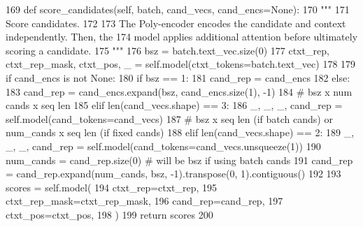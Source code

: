 \begin{DoxyCode}
169     \textcolor{keyword}{def }score\_candidates(self, batch, cand\_vecs, cand\_encs=None):
170         \textcolor{stringliteral}{"""}
171 \textcolor{stringliteral}{        Score candidates.}
172 \textcolor{stringliteral}{}
173 \textcolor{stringliteral}{        The Poly-encoder encodes the candidate and context independently. Then, the}
174 \textcolor{stringliteral}{        model applies additional attention before ultimately scoring a candidate.}
175 \textcolor{stringliteral}{        """}
176         bsz = batch.text\_vec.size(0)
177         ctxt\_rep, ctxt\_rep\_mask, ctxt\_pos, \_ = self.model(ctxt\_tokens=batch.text\_vec)
178 
179         \textcolor{keywordflow}{if} cand\_encs \textcolor{keywordflow}{is} \textcolor{keywordflow}{not} \textcolor{keywordtype}{None}:
180             \textcolor{keywordflow}{if} bsz == 1:
181                 cand\_rep = cand\_encs
182             \textcolor{keywordflow}{else}:
183                 cand\_rep = cand\_encs.expand(bsz, cand\_encs.size(1), -1)
184         \textcolor{comment}{# bsz x num cands x seq len}
185         \textcolor{keywordflow}{elif} len(cand\_vecs.shape) == 3:
186             \_, \_, \_, cand\_rep = self.model(cand\_tokens=cand\_vecs)
187         \textcolor{comment}{# bsz x seq len (if batch cands) or num\_cands x seq len (if fixed cands)}
188         \textcolor{keywordflow}{elif} len(cand\_vecs.shape) == 2:
189             \_, \_, \_, cand\_rep = self.model(cand\_tokens=cand\_vecs.unsqueeze(1))
190             num\_cands = cand\_rep.size(0)  \textcolor{comment}{# will be bsz if using batch cands}
191             cand\_rep = cand\_rep.expand(num\_cands, bsz, -1).transpose(0, 1).contiguous()
192 
193         scores = self.model(
194             ctxt\_rep=ctxt\_rep,
195             ctxt\_rep\_mask=ctxt\_rep\_mask,
196             cand\_rep=cand\_rep,
197             ctxt\_pos=ctxt\_pos,
198         )
199         \textcolor{keywordflow}{return} scores
200 
\end{DoxyCode}
\mbox{\label{classparlai_1_1agents_1_1transformer_1_1polyencoder_1_1PolyencoderAgent_a02cea5573a5135f5a7201c49296abded}} 
